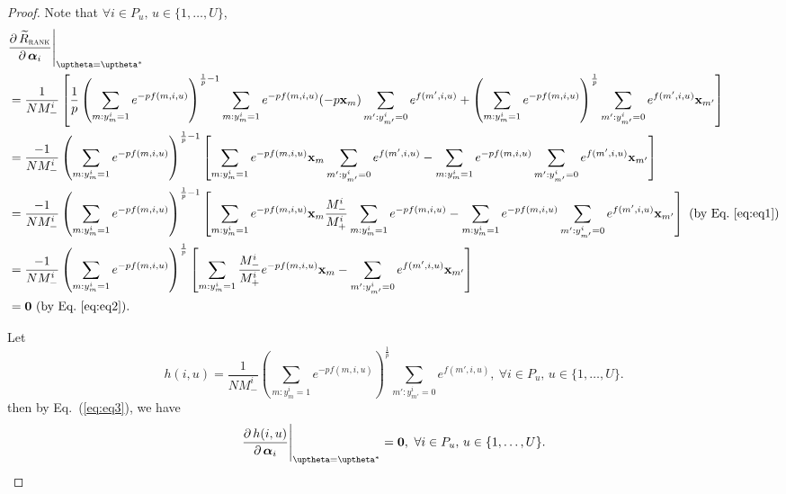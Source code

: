 \begin{proof}
Note that $\forall i \in P_u, \, u \in \{1,\dots,U\}$,
\begin{equation}
\label{eq:eq3}
\begin{aligned}
&\frac{\partial \, \widetilde R_\textsc{rank}} {\partial \, \alphabm_i} \Bigg|_{\uptheta = \uptheta^*} \\
&= \frac{1}{N M_-^i} \left[
   \frac{1}{p} \left( \sum_{m: y_m^i = 1} e^{-p f(m, i, u)} \right)^{\frac{1}{p} - 1} 
   \sum_{m: y_m^i = 1} e^{-p f(m, i, u)} (-p \x_m) 
   \sum_{m': y_{m'}^i = 0} e^{f(m', i, u)} + 
   \left( \sum_{m: y_m^i = 1} e^{-p f(m, i, u)} \right)^\frac{1}{p}
   \sum_{m': y_{m'}^i = 0} e^{f(m', i, u)} \x_{m'} \right] \\
&= \frac{-1}{N M_-^i}
   \left( \sum_{m: y_m^i = 1} e^{-p f(m, i, u)} \right)^{\frac{1}{p} - 1} 
   \left[
   \sum_{m: y_m^i = 1} e^{-p f(m, i, u)} \x_m 
   \sum_{m': y_{m'}^i = 0} e^{f(m', i, u)} -
   \sum_{m: y_m^i = 1} e^{-p f(m, i, u)}
   \sum_{m': y_{m'}^i = 0} e^{f(m', i, u)} \x_{m'} \right] \\
&= \frac{-1}{N M_-^i}
   \left( \sum_{m: y_m^i = 1} e^{-p f(m, i, u)} \right)^{\frac{1}{p} - 1} 
   \left[
   \sum_{m: y_m^i = 1} e^{-p f(m, i, u)} \x_m 
   \frac{M_-^i}{M_+^i} \sum_{m: y_m^i = 1} e^{-p f(m, i, u)} -
   \sum_{m: y_m^i = 1} e^{-p f(m, i, u)}
   \sum_{m': y_{m'}^i = 0} e^{f(m', i, u)} \x_{m'} \right] \ (\text{by Eq.~\ref{eq:eq1}}) \\
&= \frac{-1}{N M_-^i}
   \left( \sum_{m: y_m^i = 1} e^{-p f(m, i, u)} \right)^\frac{1}{p}
   \left[
   \sum_{m: y_m^i = 1} \frac{M_-^i}{M_+^i} e^{-p f(m, i, u)} \x_m -
   \sum_{m': y_{m'}^i = 0} e^{f(m', i, u)} \x_{m'} \right] \\
&= \zero \ (\text{by Eq.~\ref{eq:eq2}}).
\end{aligned}
\end{equation}

Let 
\begin{equation*}
h(i, u) 
= \frac{1}{N M_-^i} \left( \sum_{m: y_m^i = 1} e^{-p f(m, i, u)} \right)^\frac{1}{p} 
  \sum_{m': y_{m'}^i = 0} e^{f(m', i, u)},
\ \forall i \in P_u, \, u \in \{1,\dots,U\}.
\end{equation*}
then by Eq.~(\ref{eq:eq3}), we have
\begin{equation}
\label{eq:eq4}
\frac{\partial \, h(i, u)}{\partial \, \alphabm_i} \Bigg|_{\uptheta = \uptheta^*} = \zero,
\ \forall i \in P_u, \, u \in \{1,\dots,U\}.
\end{equation}


\end{proof}
